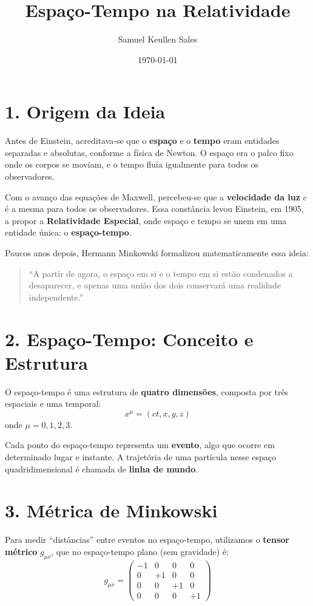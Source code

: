 \documentclass[a4paper,12pt]{article}
\title{Espaço-Tempo na Relatividade}
\author{Samuel Keullen Sales}
\date{\today}
\begin{document}
\maketitle

\section*{1. Origem da Ideia}

Antes de Einstein, acreditava-se que o \textbf{espaço} e o \textbf{tempo} eram entidades separadas e absolutas, conforme a física de Newton.  
O espaço era o palco fixo onde os corpos se moviam, e o tempo fluía igualmente para todos os observadores.

Com o avanço das equações de Maxwell, percebeu-se que a \textbf{velocidade da luz} $c$ é a mesma para todos os observadores.  
Essa constância levou Einstein, em 1905, a propor a \textbf{Relatividade Especial}, onde espaço e tempo se unem em uma entidade única: o \textbf{espaço-tempo}.

Poucos anos depois, Hermann Minkowski formalizou matematicamente essa ideia:
\begin{quote}
``A partir de agora, o espaço em si e o tempo em si estão condenados a desaparecer, e apenas uma união dos dois conservará uma realidade independente.''
\end{quote}

\section*{2. Espaço-Tempo: Conceito e Estrutura}

O espaço-tempo é uma estrutura de \textbf{quatro dimensões}, composta por três espaciais e uma temporal:
\[
x^{\mu} = (ct, x, y, z)
\]
onde $\mu = 0,1,2,3$.

Cada ponto do espaço-tempo representa um \textbf{evento}, algo que ocorre em determinado lugar e instante.  
A trajetória de uma partícula nesse espaço quadridimensional é chamada de \textbf{linha de mundo}.

\section*{3. Métrica de Minkowski}

Para medir “distâncias” entre eventos no espaço-tempo, utilizamos o \textbf{tensor métrico} $g_{\mu\nu}$, que no espaço-tempo plano (sem gravidade) é:
\[
g_{\mu\nu} =
\begin{pmatrix}
-1 & 0 & 0 & 0 \\
0 & +1 & 0 & 0 \\
0 & 0 & +1 & 0 \\
0 & 0 & 0 & +1
\end{pmatrix}
\]
\end{document}
